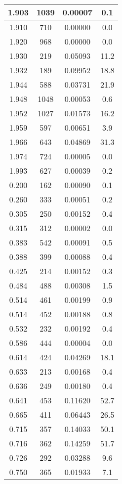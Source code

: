 \begin{longtable}{c | c | c | c}
1.903 & 1039 & 0.00007 &  0.1 \\ \hline 
1.910 &  710 & 0.00000 &  0.0 \\ \hline 
1.920 &  968 & 0.00000 &  0.0 \\ \hline 
1.930 &  219 & 0.05093 & 11.2 \\ \hline 
1.932 &  189 & 0.09952 & 18.8 \\ \hline 
1.944 &  588 & 0.03731 & 21.9 \\ \hline 
1.948 & 1048 & 0.00053 &  0.6 \\ \hline 
1.952 & 1027 & 0.01573 & 16.2 \\ \hline 
1.959 &  597 & 0.00651 &  3.9 \\ \hline 
1.966 &  643 & 0.04869 & 31.3 \\ \hline 
1.974 &  724 & 0.00005 &  0.0 \\ \hline 
1.993 &  627 & 0.00039 &  0.2 \\ \hline 
0.200 &  162 & 0.00090 &  0.1 \\ \hline 
0.260 &  333 & 0.00051 &  0.2 \\ \hline 
0.305 &  250 & 0.00152 &  0.4 \\ \hline 
0.315 &  312 & 0.00002 &  0.0 \\ \hline 
0.383 &  542 & 0.00091 &  0.5 \\ \hline 
0.388 &  399 & 0.00088 &  0.4 \\ \hline 
0.425 &  214 & 0.00152 &  0.3 \\ \hline 
0.484 &  488 & 0.00308 &  1.5 \\ \hline 
0.514 &  461 & 0.00199 &  0.9 \\ \hline 
0.514 &  452 & 0.00188 &  0.8 \\ \hline 
0.532 &  232 & 0.00192 &  0.4 \\ \hline 
0.586 &  444 & 0.00004 &  0.0 \\ \hline 
0.614 &  424 & 0.04269 & 18.1 \\ \hline 
0.633 &  213 & 0.00168 &  0.4 \\ \hline 
0.636 &  249 & 0.00180 &  0.4 \\ \hline 
0.641 &  453 & 0.11620 & 52.7 \\ \hline 
0.665 &  411 & 0.06443 & 26.5 \\ \hline 
0.715 &  357 & 0.14033 & 50.1 \\ \hline 
0.716 &  362 & 0.14259 & 51.7 \\ \hline 
0.726 &  292 & 0.03288 &  9.6 \\ \hline 
0.750 &  365 & 0.01933 &  7.1 \\ \hline 

\end{longtable}
